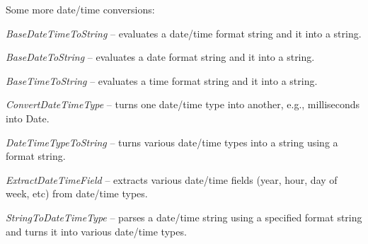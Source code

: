Some more date/time conversions:
\begin{tight_itemize}
	\item \textit{BaseDateTimeToString} -- evaluates a date/time format string 
	and it into a string.
	\item \textit{BaseDateToString} -- evaluates a date format string 
	and it into a string.
	\item \textit{BaseTimeToString} -- evaluates a time format string 
	and it into a string.
	\item \textit{ConvertDateTimeType} -- turns one date/time type into another,
	e.g., milliseconds into Date.
	\item \textit{DateTimeTypeToString} -- turns various date/time types into a 
	string using a format string.
	\item \textit{ExtractDateTimeField} -- extracts various date/time fields 
	(year, hour, day of week, etc) from date/time types.
	\item \textit{StringToDateTimeType} -- parses a date/time string using a 
	specified format string and turns it into various date/time types.
\end{tight_itemize}

\newpage
